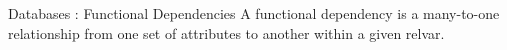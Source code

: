Databases : Functional Dependencies
A functional dependency is a many-to-one relationship from one set of attributes to another within a given relvar.
